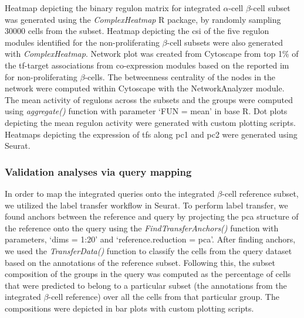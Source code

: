 \par Heatmap depicting the binary regulon matrix for integrated $\alpha$-cell $\beta$-cell subset was generated using the \textit{ComplexHeatmap} R package, by randomly sampling 30000 cells from the subset. Heatmap depicting the \gls{csi} of the five regulon modules identified for the non-proliferating $\beta$-cell subsets were also generated with \textit{ComplexHeatmap}. Network plot was created from Cytoscape \textbf{\cite{shannon_cytoscape_2003}} from top 1\%  of the \gls{tf}-target associations from co-expression modules based on the reported \gls{im} for non-proliferating $\beta$-cells. The betweenness centrality of the nodes in the network were computed within Cytoscape with the NetworkAnalyzer module. The mean activity of regulons across the subsets and the groups were computed using \textit{aggregate()} function with parameter `FUN = mean' in base R. Dot plots depicting the mean regulon activity were generated with custom plotting scripts. Heatmaps depicting the expression of \glspl{tf} along \gls{pc}1 and \gls{pc}2 were generated using Seurat.


\subsubsection{\large Validation analyses via query mapping}
\label{subsubsec:met_chp3_validation}
In order to map the integrated queries onto the integrated $\beta$-cell reference subset, we utilized the label transfer workflow in Seurat. To perform label transfer, we found anchors between the reference and query by projecting the \gls{pca} structure of the reference onto the query using the \textit{FindTransferAnchors()} function with parameters, `dims = 1:20' and `reference.reduction = pca'. After finding anchors, we used the \textit{TransferData()} function to classify the cells from the query dataset based on the annotations of the reference subset. Following this, the subset composition of the groups in the query was computed as the percentage of cells that were predicted to belong to a particular subset (the annotations from the integrated $\beta$-cell reference) over all the cells from that particular group. The compositions were depicted in bar plots with custom plotting scripts.


\clearpage

